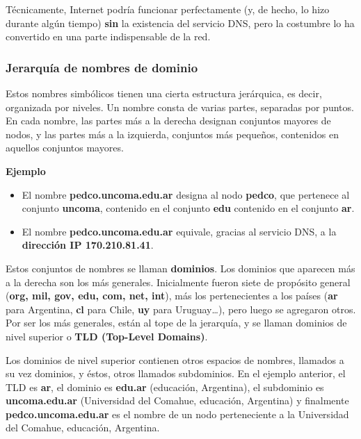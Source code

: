 \documentclass[spanish,a4paper,]{article}
\providecommand{\tightlist}{%
  \setlength{\itemsep}{0pt}\setlength{\parskip}{0pt}}
\begin{document}
Técnicamente, Internet podría funcionar perfectamente (y, de hecho, lo
hizo durante algún tiempo) \textbf{sin} la existencia del servicio DNS,
pero la costumbre lo ha convertido en una parte indispensable de la red.

\hypertarget{jerarquuxeda-de-nombres-de-dominio}{%
\subsubsection{Jerarquía de nombres de
dominio}\label{jerarquuxeda-de-nombres-de-dominio}}

Estos nombres simbólicos tienen una cierta estructura jerárquica, es
decir, organizada por niveles. Un nombre consta de varias partes,
separadas por puntos. En cada nombre, las partes más a la derecha
designan conjuntos mayores de nodos, y las partes más a la izquierda,
conjuntos más pequeños, contenidos en aquellos conjuntos mayores.

\textbf{Ejemplo}

\begin{itemize}
\tightlist
\item
  El nombre \textbf{pedco.uncoma.edu.ar} designa al nodo \textbf{pedco},
  que pertenece al conjunto \textbf{uncoma}, contenido en el conjunto
  \textbf{edu} contenido en el conjunto \textbf{ar}.
\item
  El nombre \textbf{pedco.uncoma.edu.ar} equivale, gracias al servicio
  DNS, a la \textbf{dirección IP 170.210.81.41}.
\end{itemize}

Estos conjuntos de nombres se llaman \textbf{dominios}. Los dominios que
aparecen más a la derecha son los más generales. Inicialmente fueron
siete de propósito general (\textbf{org, mil, gov, edu, com, net, int}),
más los pertenecientes a los países (\textbf{ar} para Argentina,
\textbf{cl} para Chile, \textbf{uy} para Uruguay\ldots{}), pero luego se
agregaron otros. Por ser los más generales, están al tope de la
jerarquía, y se llaman dominios de nivel superior o \textbf{TLD
(Top-Level Domains)}.

Los dominios de nivel superior contienen otros espacios de nombres,
llamados a su vez dominios, y éstos, otros llamados subdominios. En el
ejemplo anterior, el TLD es \textbf{ar}, el dominio es \textbf{edu.ar}
(educación, Argentina), el subdominio es \textbf{uncoma.edu.ar}
(Universidad del Comahue, educación, Argentina) y finalmente
\textbf{pedco.uncoma.edu.ar} es el nombre de un nodo perteneciente a la
Universidad del Comahue, educación, Argentina.
\end{document}
